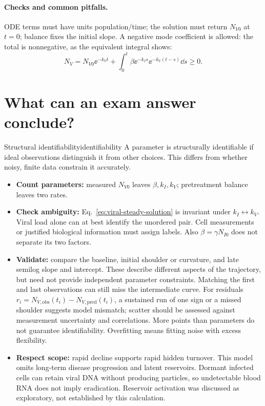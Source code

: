 \paragraph{Checks and common pitfalls.}
ODE terms must have units population/time; the solution must return $N_{V0}$ at $t=0$; balance fixes the initial slope. A negative mode coefficient is allowed: the total is nonnegative, as the equivalent integral shows:
\begin{equation}\label{eq:viral-positive-integral}
N_V=N_{V0}\ee^{-k_Vt}+\int_0^t\beta\ee^{-k_Is}\ee^{-k_V(t-s)}\dd s\geq0.
\end{equation}

\section{What can an exam answer conclude?}\label{sec:fit-identifiability}
\begin{definition}{Structural identifiability}{identifiability}
A parameter is structurally identifiable if ideal observations distinguish it from other choices. This differs from whether noisy, finite data constrain it accurately.
\end{definition}
\begin{itemize}
\item \textbf{Count parameters:} measured $N_{V0}$ leaves $\beta,k_I,k_V$; pretreatment balance leaves two rates.
\item \textbf{Check ambiguity:} Eq.~\eqref{eq:viral-steady-solution} is invariant under $k_I\leftrightarrow k_V$. Viral load alone can at best identify the unordered pair. Cell measurements or justified biological information must assign labels. Also $\beta=\gamma N_{I0}$ does not separate its two factors.
\item \textbf{Validate:} compare the baseline, initial shoulder or curvature, and late semilog slope and intercept. These describe different aspects of the trajectory, but need not provide independent parameter constraints. Matching the first and last observations can still miss the intermediate curve. For residuals $r_i=N_{V,\mathrm{obs}}(t_i)-N_{V,\mathrm{pred}}(t_i)$, a sustained run of one sign or a missed shoulder suggests model mismatch; scatter should be assessed against measurement uncertainty and correlations. More points than parameters do not guarantee identifiability. Overfitting means fitting noise with excess flexibility.
\item \textbf{Respect scope:} rapid decline supports rapid hidden turnover. This model omits long-term disease progression and latent reservoirs. Dormant infected cells can retain viral DNA without producing particles, so undetectable blood RNA does not imply eradication. Reservoir activation was discussed as exploratory, not established by this calculation.
\end{itemize}

